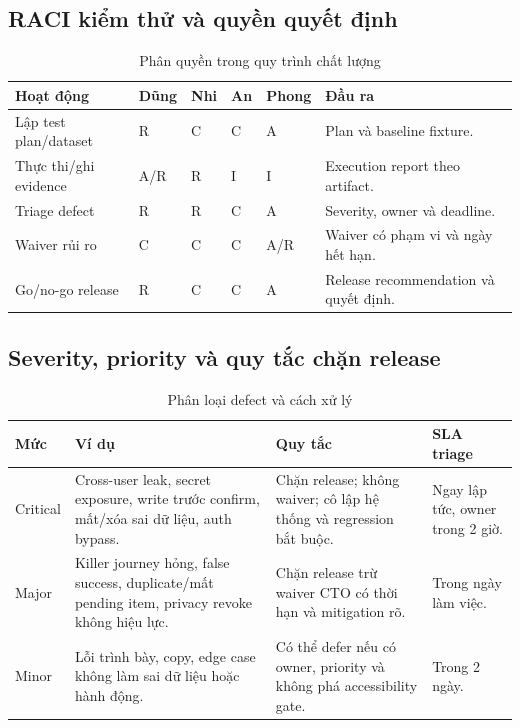 \documentclass[12pt,a4paper]{article}
\begin{document}
\subsection{RACI kiểm thử và quyền quyết định}
\begin{table}[H]
\centering
\caption{Phân quyền trong quy trình chất lượng}
\begin{tabularx}{\textwidth}{P{3.4cm}C{1.35cm}C{1.35cm}C{1.35cm}C{1.35cm}Y}
\color{white}\textbf{Hoạt động} & \color{white}\textbf{Dũng} &
\color{white}\textbf{Nhi} & \color{white}\textbf{An} &
\color{white}\textbf{Phong} & \color{white}\textbf{Đầu ra}\\
\toprule
Lập test plan/dataset & R & C & C & A & Plan và baseline fixture.\\
Thực thi/ghi evidence & A/R & R & I & I & Execution report theo artifact.\\
Triage defect & R & R & C & A & Severity, owner và deadline.\\
Waiver rủi ro & C & C & C & A/R & Waiver có phạm vi và ngày hết hạn.\\
Go/no-go release & R & C & C & A & Release recommendation và quyết định.\\
\bottomrule
\end{tabularx}
\end{table}

\subsection{Severity, priority và quy tắc chặn release}
\begin{table}[H]
\centering
\caption{Phân loại defect và cách xử lý}
\begin{tabularx}{\textwidth}{P{2.2cm}P{4.5cm}Y P{3.2cm}}
\textbf{Mức} & \textbf{Ví dụ} & \textbf{Quy tắc} &
\textbf{SLA triage}\\
\toprule
Critical & Cross-user leak, secret exposure, write trước confirm, mất/xóa sai dữ
liệu, auth bypass. & Chặn release; không waiver; cô lập hệ thống và regression bắt
buộc. & Ngay lập tức, owner trong 2 giờ.\\
Major & Killer journey hỏng, false success, duplicate/mất pending item, privacy
revoke không hiệu lực. & Chặn release trừ waiver CTO có thời hạn và mitigation rõ. &
Trong ngày làm việc.\\
Minor & Lỗi trình bày, copy, edge case không làm sai dữ liệu hoặc hành động. & Có
thể defer nếu có owner, priority và không phá accessibility gate. & Trong 2 ngày.\\
\bottomrule
\end{tabularx}
\end{table}
\end{document}
